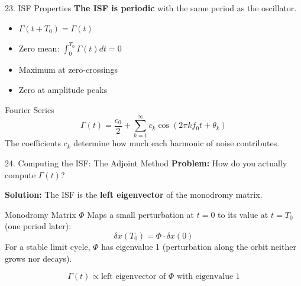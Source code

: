 \documentclass[aspectratio=169, 11pt]{beamer}
\begin{document}
\begin{frame}{23. ISF Properties}
    \textbf{The ISF is periodic} with the same period as the oscillator.

    \vspace{0.5em}
    \begin{itemize}
        \item $\Gamma(t + T_0) = \Gamma(t)$
        \item Zero mean: $\int_0^{T_0} \Gamma(t) dt = 0$
        \item Maximum at zero-crossings
        \item Zero at amplitude peaks
    \end{itemize}

    \vspace{0.5em}
    \begin{block}{Fourier Series}
        \[ \Gamma(t) = \frac{c_0}{2} + \sum_{k=1}^{\infty} c_k \cos(2\pi k f_0 t + \theta_k) \]
        The coefficients $c_k$ determine how much each harmonic of noise contributes.
    \end{block}
\end{frame}

\begin{frame}{24. Computing the ISF: The Adjoint Method}
    \textbf{Problem:} How do you actually compute $\Gamma(t)$?

    \vspace{0.5em}
    \textbf{Solution:} The ISF is the \textbf{left eigenvector} of the monodromy matrix.

    \vspace{0.5em}
    \begin{block}{Monodromy Matrix $\Phi$}
        Maps a small perturbation at $t=0$ to its value at $t=T_0$ (one period later):
        \[ \delta x(T_0) = \Phi \cdot \delta x(0) \]
        For a stable limit cycle, $\Phi$ has eigenvalue 1 (perturbation along the orbit neither grows nor decays).
    \end{block}

    \vspace{0.5em}
    \[ \Gamma(t) \propto \text{left eigenvector of } \Phi \text{ with eigenvalue } 1 \]
\end{frame}
\end{document}
